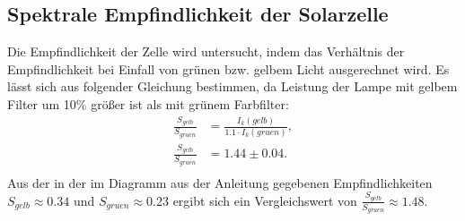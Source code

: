 \subsection*{Spektrale Empfindlichkeit der Solarzelle}
Die Empfindlichkeit der Zelle wird untersucht, indem das Verhältnis der Empfindlichkeit bei Einfall von grünen bzw. gelbem Licht ausgerechnet wird. Es lässt sich aus folgender Gleichung bestimmen, da Leistung der Lampe mit gelbem Filter um 10\% größer ist als mit grünem Farbfilter:
\begin{align*}
\frac{S_{gelb}}{S_{gruen}}&=\frac{I_{k}(gelb)}{1.1\cdot I_{k}(gruen)},\\
\frac{S_{gelb}}{S_{gruen}}&=1.44\pm 0.04.\\
\end{align*}
Aus der in der im Diagramm aus der Anleitung gegebenen Empfindlichkeiten $S_{gelb}\approx 0.34$ und $S_{gruen}\approx 0.23$ ergibt sich ein Vergleichswert von $\frac{S_{gelb}}{S_{gruen}}\approx 1.48$.
 